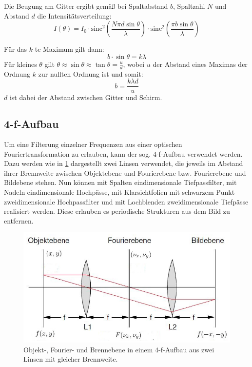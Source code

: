 \documentclass[
	a4paper,
	12pt,
	pagesize,
	ngerman
]{scrartcl}
\begin{document}
	Die Beugung am Gitter ergibt gemäß \cite{Anleitung} bei Spaltabstand $b$, Spaltzahl $N$ und Abstand $d$ die Intensitätsverteilung:
	\begin{equation}
		I(\theta) = I_0 \cdot \text{sinc}^2\left(\frac{N \pi d \sin \theta}{\lambda} \right) \cdot \text{sinc}^2\left(\frac{\pi b \sin \theta}{\lambda} \right)
	\end{equation}


	Für das $k$-te Maximum gilt dann:
	\begin{equation}
		b \cdot \sin{\theta} = k \lambda
	\end{equation}
	Für kleines $\theta$ gilt $\theta \approx \sin{\theta} \approx \tan{\theta}=\frac{u}{d}$, wobei $u$ der Abstand eines Maximas der Ordnung $k$ zur nullten Ordnung ist und somit:
	\begin{equation}
		\label{eq_beug}
		b = \frac{k\lambda d}{u}
	\end{equation}
	$d$ ist dabei der Abstand zwischen Gitter und Schirm.

	\subsection{4-f-Aufbau}
	Um eine Filterung einzelner Frequenzen aus einer optischen Fouriertransformation zu erlauben, kann der sog. 4-f-Aufbau verwendet werden.
	Dazu werden wie in \cref{fig_4f_schema} dargestellt zwei Linsen verwendet, die jeweils im Abstand ihrer Brennweite zwischen Objektebene und Fourierebene bzw. Fourierebene und Bildebene stehen.
	Nun können mit Spalten eindimensionale Tiefpassfilter, mit Nadeln eindimensionale Hochpässe, mit Klarsichtfolien mit schwarzem Punkt zweidimensionale Hochpassfilter und mit Lochblenden zweidimensionale Tiefpässe realisiert werden.
	Diese erlauben es periodische Strukturen aus dem Bild zu entfernen.

	\begin{figure}[H]
			\includegraphics[width=1\linewidth]{img/4f_schema}
			\caption{
				Objekt-, Fourier- und Brennebene in einem 4-f-Aufbau aus zwei Linsen mit gleicher Brennweite. \cite{Anleitung}
			}
			\label{fig_4f_schema}
	\end{figure}
\end{document}
